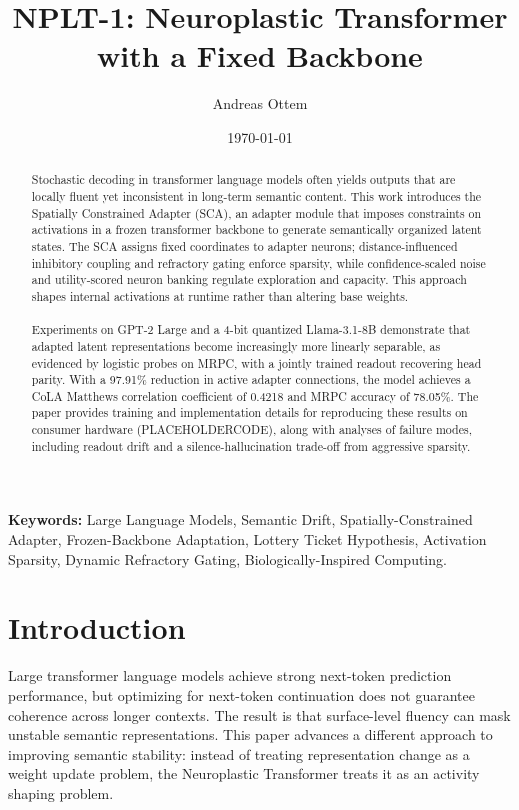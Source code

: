 \documentclass[11pt, letterpaper]{article}
\title{NPLT-1: Neuroplastic Transformer with a Fixed Backbone}
\author{Andreas Ottem}
\affil{Independent Researcher \\ Alta, Norway \\ \texttt{andreas.ottem@icloud.com}}
\date{\today}
\begin{document}
\maketitle

\begin{abstract}

Stochastic decoding in transformer language models often yields outputs that are locally fluent yet inconsistent in long-term semantic content. This work introduces the Spatially Constrained Adapter (SCA), an adapter module that imposes constraints on activations in a frozen transformer backbone to generate semantically organized latent states. The SCA assigns fixed coordinates to adapter neurons; distance-influenced inhibitory coupling and refractory gating enforce sparsity, while confidence-scaled noise and utility-scored neuron banking regulate exploration and capacity. This approach shapes internal activations at runtime rather than altering base weights.

\paragraph{} Experiments on GPT-2 Large and a 4-bit quantized Llama-3.1-8B demonstrate that adapted latent representations become increasingly more linearly separable, as evidenced by logistic probes on MRPC, with a jointly trained readout recovering head parity. With a 97.91\% reduction in active adapter connections, the model achieves a CoLA Matthews correlation coefficient of 0.4218 and MRPC accuracy of 78.05\%. The paper provides training and implementation details for reproducing these results on consumer hardware (PLACEHOLDERCODE), along with analyses of failure modes, including readout drift and a silence-hallucination trade-off from aggressive sparsity.

\end{abstract}

\vspace{1em}
\noindent\textbf{Keywords:} Large Language Models, Semantic Drift, 
Spatially-Constrained Adapter, Frozen-Backbone Adaptation, Lottery Ticket Hypothesis, Activation Sparsity, Dynamic Refractory Gating, 
Biologically-Inspired Computing.

\section{Introduction}

Large transformer language models achieve strong next-token prediction performance, but optimizing for next-token continuation does not guarantee coherence across longer contexts. The result is that surface-level fluency can mask unstable semantic representations. This paper advances a different approach to improving semantic stability: instead of treating representation change as a weight update problem, the Neuroplastic Transformer treats it as an activity shaping problem.
\end{document}

